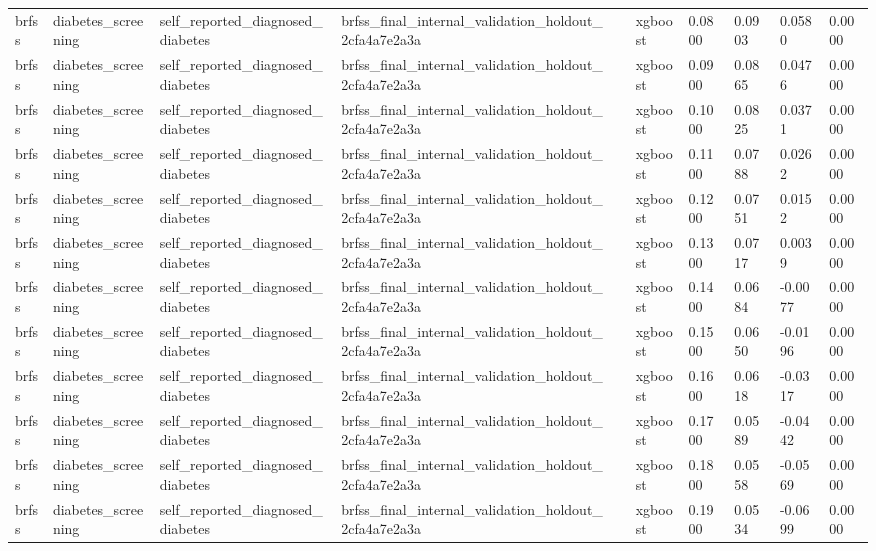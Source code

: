 \begin{tabular}{llllllllll}
brfss & diabetes\_screening & self\_reported\_diagnosed\_diabetes & brfss\_final\_internal\_validation\_holdout\_2cfa4a7e2a3a &  & xgboost & 0.0800 & 0.0903 & 0.0580 & 0.0000 \\
brfss & diabetes\_screening & self\_reported\_diagnosed\_diabetes & brfss\_final\_internal\_validation\_holdout\_2cfa4a7e2a3a &  & xgboost & 0.0900 & 0.0865 & 0.0476 & 0.0000 \\
brfss & diabetes\_screening & self\_reported\_diagnosed\_diabetes & brfss\_final\_internal\_validation\_holdout\_2cfa4a7e2a3a &  & xgboost & 0.1000 & 0.0825 & 0.0371 & 0.0000 \\
brfss & diabetes\_screening & self\_reported\_diagnosed\_diabetes & brfss\_final\_internal\_validation\_holdout\_2cfa4a7e2a3a &  & xgboost & 0.1100 & 0.0788 & 0.0262 & 0.0000 \\
brfss & diabetes\_screening & self\_reported\_diagnosed\_diabetes & brfss\_final\_internal\_validation\_holdout\_2cfa4a7e2a3a &  & xgboost & 0.1200 & 0.0751 & 0.0152 & 0.0000 \\
brfss & diabetes\_screening & self\_reported\_diagnosed\_diabetes & brfss\_final\_internal\_validation\_holdout\_2cfa4a7e2a3a &  & xgboost & 0.1300 & 0.0717 & 0.0039 & 0.0000 \\
brfss & diabetes\_screening & self\_reported\_diagnosed\_diabetes & brfss\_final\_internal\_validation\_holdout\_2cfa4a7e2a3a &  & xgboost & 0.1400 & 0.0684 & -0.0077 & 0.0000 \\
brfss & diabetes\_screening & self\_reported\_diagnosed\_diabetes & brfss\_final\_internal\_validation\_holdout\_2cfa4a7e2a3a &  & xgboost & 0.1500 & 0.0650 & -0.0196 & 0.0000 \\
brfss & diabetes\_screening & self\_reported\_diagnosed\_diabetes & brfss\_final\_internal\_validation\_holdout\_2cfa4a7e2a3a &  & xgboost & 0.1600 & 0.0618 & -0.0317 & 0.0000 \\
brfss & diabetes\_screening & self\_reported\_diagnosed\_diabetes & brfss\_final\_internal\_validation\_holdout\_2cfa4a7e2a3a &  & xgboost & 0.1700 & 0.0589 & -0.0442 & 0.0000 \\
brfss & diabetes\_screening & self\_reported\_diagnosed\_diabetes & brfss\_final\_internal\_validation\_holdout\_2cfa4a7e2a3a &  & xgboost & 0.1800 & 0.0558 & -0.0569 & 0.0000 \\
brfss & diabetes\_screening & self\_reported\_diagnosed\_diabetes & brfss\_final\_internal\_validation\_holdout\_2cfa4a7e2a3a &  & xgboost & 0.1900 & 0.0534 & -0.0699 & 0.0000 \\

\end{tabular}

